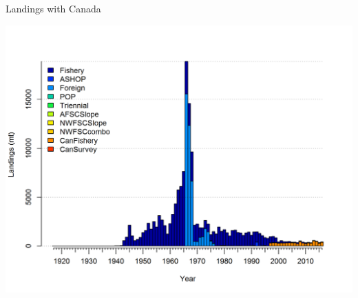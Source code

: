 \documentclass[pdf]{beamer}\usepackage[]{graphicx}\usepackage[]{color}
\begin{document}
\begin{frame}{Landings with Canada}
  \begin{center}
  \includegraphics[scale = 0.50]{figures/Catches_w_Canada.png}
  \end{center}
\end{frame}
\end{document}
